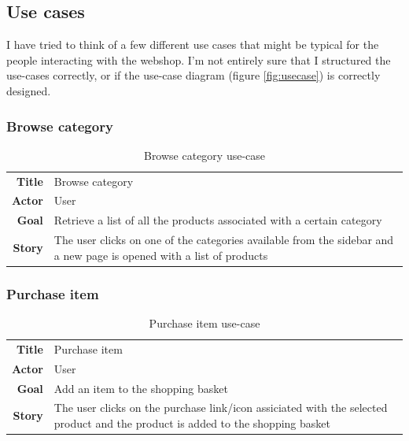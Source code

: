 \documentclass[12pt, a4paper,titlepage]{article}
\begin{document}
\subsection{Use cases}
I have tried to think of a few different use cases that might be typical for the
people interacting with the webshop. I'm not entirely sure that I structured
the use-cases correctly, or if the use-case diagram (figure \ref{fig:usecase}) is
correctly designed.

\subsubsection{Browse category}

\begin{table}[H]
\centering
\begin{tabular}{r | p{12cm}}
\textbf{Title} & Browse category \\
\textbf{Actor} & User \\
\textbf{Goal} & Retrieve a list of all the products associated with a certain category \\
\textbf{Story} & The user clicks on one of the categories available from the sidebar and a new page is opened with a list of products \\
\end{tabular}
\caption{Browse category use-case}
\end{table}

\subsubsection{Purchase item}
\begin{table}[H]
\centering
\begin{tabular}{r | p{12cm}}
\textbf{Title} & Purchase item \\
\textbf{Actor} & User \\
\textbf{Goal} & Add an item to the shopping basket \\
\textbf{Story} & The user clicks on the purchase link/icon assiciated with the selected product and the product is added to the shopping basket\\
\end{tabular}
\caption{Purchase item use-case}
\end{table}
\end{document}
